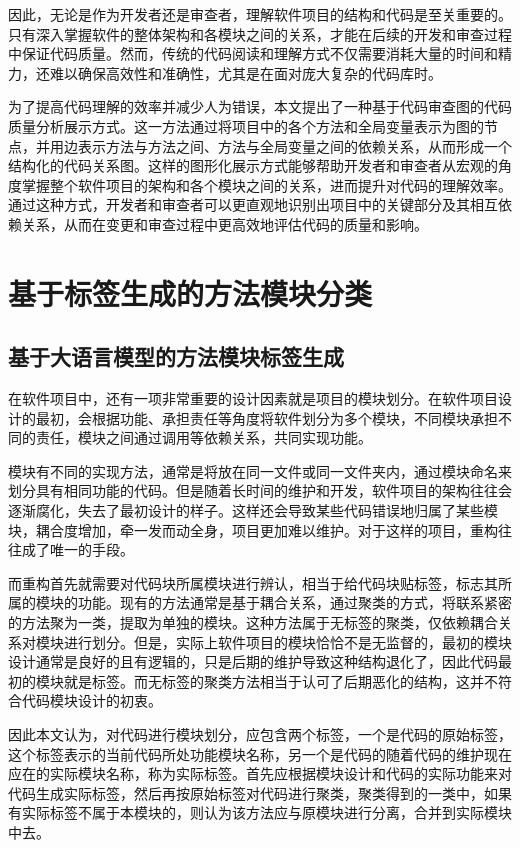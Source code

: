 因此，无论是作为开发者还是审查者，理解软件项目的结构和代码是至关重要的。只有深入掌握软件的整体架构和各模块之间的关系，才能在后续的开发和审查过程中保证代码质量。然而，传统的代码阅读和理解方式不仅需要消耗大量的时间和精力，还难以确保高效性和准确性，尤其是在面对庞大复杂的代码库时。

为了提高代码理解的效率并减少人为错误，本文提出了一种基于代码审查图的代码质量分析展示方式。这一方法通过将项目中的各个方法和全局变量表示为图的节点，并用边表示方法与方法之间、方法与全局变量之间的依赖关系，从而形成一个结构化的代码关系图。这样的图形化展示方式能够帮助开发者和审查者从宏观的角度掌握整个软件项目的架构和各个模块之间的关系，进而提升对代码的理解效率。通过这种方式，开发者和审查者可以更直观地识别出项目中的关键部分及其相互依赖关系，从而在变更和审查过程中更高效地评估代码的质量和影响。

\section{基于标签生成的方法模块分类}
\subsection{基于大语言模型的方法模块标签生成}

在软件项目中，还有一项非常重要的设计因素就是项目的模块划分。在软件项目设计的最初，会根据功能、承担责任等角度将软件划分为多个模块，不同模块承担不同的责任，模块之间通过调用等依赖关系，共同实现功能。

模块有不同的实现方法，通常是将放在同一文件或同一文件夹内，通过模块命名来划分具有相同功能的代码。但是随着长时间的维护和开发，软件项目的架构往往会逐渐腐化，失去了最初设计的样子。这样还会导致某些代码错误地归属了某些模块，耦合度增加，牵一发而动全身，项目更加难以维护。对于这样的项目，重构往往成了唯一的手段。

而重构首先就需要对代码块所属模块进行辨认，相当于给代码块贴标签，标志其所属的模块的功能。现有的方法通常是基于耦合关系，通过聚类的方式\cite{2017Extraction}，将联系紧密的方法聚为一类，提取为单独的模块。这种方法属于无标签的聚类，仅依赖耦合关系对模块进行划分。但是，实际上软件项目的模块恰恰不是无监督的，最初的模块设计通常是良好的且有逻辑的，只是后期的维护导致这种结构退化了，因此代码最初的模块就是标签。而无标签的聚类方法相当于认可了后期恶化的结构，这并不符合代码模块设计的初衷。

因此本文认为，对代码进行模块划分，应包含两个标签，一个是代码的原始标签，这个标签表示的当前代码所处功能模块名称，另一个是代码的随着代码的维护现在应在的实际模块名称，称为实际标签。首先应根据模块设计和代码的实际功能来对代码生成实际标签，然后再按原始标签对代码进行聚类，聚类得到的一类中，如果有实际标签不属于本模块的，则认为该方法应与原模块进行分离，合并到实际模块中去。

